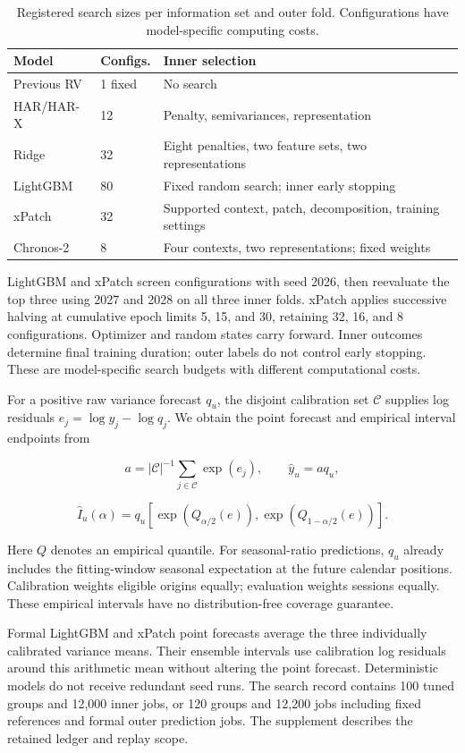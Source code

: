 \begin{table}[!t]
\centering
\footnotesize
\caption{Registered search sizes per information set and outer fold. Configurations have model-specific computing costs.}
\label{tab:results-2}
\begin{tabular}{lp{}p{}}
\toprule
Model & Configs. & Inner selection \\
\midrule
Previous RV & 1 fixed & No search \\
HAR/HAR-X & 12 & Penalty, semivariances, representation \\
Ridge & 32 & Eight penalties, two feature sets, two representations \\
LightGBM & 80 & Fixed random search; inner early stopping \\
xPatch & 32 & Supported context, patch, decomposition, training settings \\
Chronos-2 & 8 & Four contexts, two representations; fixed weights \\
\bottomrule
\end{tabular}
\end{table}

LightGBM and xPatch screen configurations with seed 2026, then
reevaluate the top three using 2027 and 2028 on all three inner folds.
xPatch applies successive halving at cumulative epoch limits 5, 15, and
30, retaining 32, 16, and 8 configurations. Optimizer and random states
carry forward. Inner outcomes determine final training duration; outer
labels do not control early stopping. These are model-specific search
budgets with different computational costs.

For a positive raw variance forecast \(q_u\), the disjoint calibration
set \(\mathcal C\) supplies log residuals \(e_j=\log y_j-\log q_j\). We
obtain the point forecast and empirical interval endpoints from

\[
a=|\mathcal C|^{-1}\sum_{j\in\mathcal C}\exp(e_j),
\qquad \widehat y_u=a q_u,
\]

\[
\widehat I_u(\alpha)
=q_u[\exp(Q_{\alpha/2}(e)),\exp(Q_{1-\alpha/2}(e))].
\]

Here \(Q\) denotes an empirical quantile. For seasonal-ratio
predictions, \(q_u\) already includes the fitting-window seasonal
expectation at the future calendar positions. Calibration weights
eligible origins equally; evaluation weights sessions equally. These
empirical intervals have no distribution-free coverage guarantee.

Formal LightGBM and xPatch point forecasts average the three
individually calibrated variance means. Their ensemble intervals use
calibration log residuals around this arithmetic mean without altering
the point forecast. Deterministic models do not receive redundant seed
runs. The search record contains 100 tuned groups and 12,000 inner jobs,
or 120 groups and 12,200 jobs including fixed references and formal
outer prediction jobs. The supplement describes the retained ledger and
replay scope.


